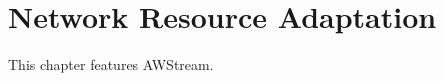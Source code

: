 \documentclass[thesis.tex]{subfiles}
\begin{document}
\chapter{Network Resource Adaptation}
\label{cha:netw-reso-adapt}

This chapter features AWStream.









\end{document}
